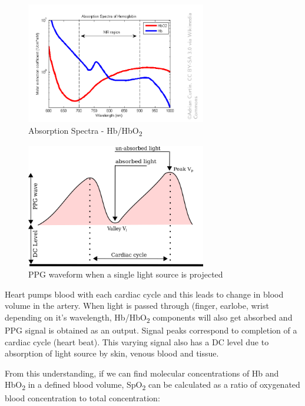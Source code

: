 	\begin{figure}[ht!]
		\centering
		\includegraphics[width=0.7\textwidth]{../common/spectra.png}
		\caption{Absorption Spectra - Hb/HbO\textsubscript{2}}
		\label{fig:spectrum}
	\end{figure}
	
	
	\begin{figure}[ht!]
		\centering
		\includegraphics[width=0.7\textwidth]{images/PPG.png}
		\caption{PPG waveform when a single light source is projected}
		\label{fig:ppg}
	\end{figure}

	Heart pumps blood with each cardiac cycle and this leads to change in blood volume in the artery. When light is passed through (finger, earlobe, wrist\cite{light} depending on it's wavelength, Hb/HbO\textsubscript{2} components will also get absorbed and PPG signal is obtained as an output. Signal peaks correspond to completion of a cardiac cycle (heart beat). This varying signal also has a DC level due to absorption of light source by skin, venous blood and tissue.

	From this understanding, if we can find molecular concentrations of Hb and HbO\textsubscript{2} in a defined blood volume, SpO\textsubscript{2} can be calculated as a ratio of oxygenated blood concentration to total concentration: 

